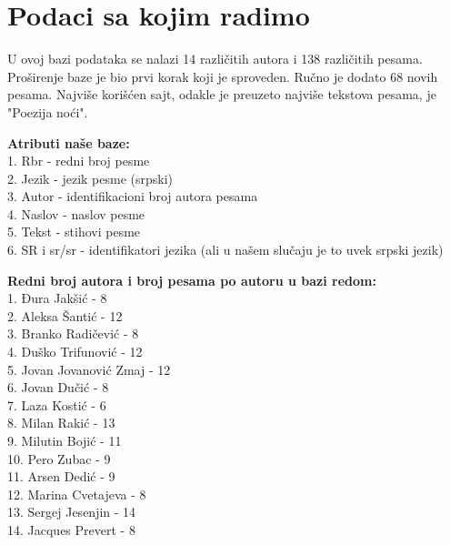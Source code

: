 \documentclass{article}
\begin{document}
\section{Podaci sa kojim radimo}
\begin{flushleft}

U ovoj bazi podataka se nalazi 14 različitih autora i 138 različitih pesama. 
Proširenje baze je bio prvi korak koji je sproveden. Ručno je dodato 68 novih 
pesama. Najviše korišćen sajt, odakle je preuzeto najviše tekstova pesama, je 
"Poezija noći".
\\\vspace{3mm}


\textbf{Atributi naše baze:} \\
1. Rbr - redni broj pesme \\
2. Jezik - jezik pesme (srpski) \\
3. Autor - identifikacioni broj autora pesama \\
4. Naslov - naslov pesme \\
5. Tekst - stihovi pesme \\
6. SR i sr/sr - identifikatori jezika (ali u našem slučaju je to uvek srpski jezik) \\
\vspace{5mm}

\textbf{Redni broj autora i broj pesama po autoru u bazi redom:} \\
1.  Đura Jakšić - 8 \\
2.  Aleksa Šantić - 12\\
3.  Branko Radičević - 8\\
4.  Duško Trifunović - 12\\
5.  Jovan Jovanović Zmaj - 12\\
6.  Jovan Dučić - 8\\
7.  Laza Kostić - 6\\
8.  Milan Rakić - 13\\
9.  Milutin Bojić - 11\\
10. Pero Zubac - 9\\
11. Arsen Dedić - 9\\
12. Marina Cvetajeva - 8 \\
13. Sergej Jesenjin - 14\\
14. Jacques Prevert - 8\\
\vspace{5mm}


\end{flushleft}


\newpage
\end{document}
